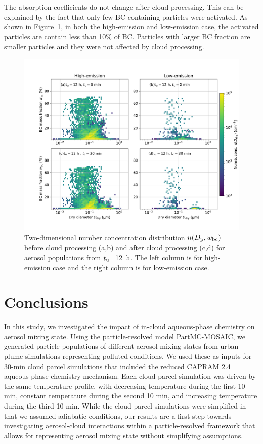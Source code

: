\documentclass[edeposit,fullpage]{uiucthesis2009}
\makeatletter
\DeclareRobustCommand*\unit[1]
 {\ensuremath{%
   {\thinmuskip3mu\relax
    \def\mu{\text{\textmu}}\def~{\,}%
    \ifx\f@series\testbx\mathbf{#1}\else\mathrm{#1}\fi}}}
\makeatother
\begin{document}
The absorption coefficients do not change after cloud processing.
This can be explained by the fact that only few BC-containing
particles were activated. As shown in Figure~\ref{fig:bc-2d}, in both
the high-emission and low-emission case, the activated particles are
contain less than 10\% of BC. Particles with larger BC fraction are
smaller particles and they were not affected by cloud processing.
 
 \begin{figure}[H]
    \centering
    \includegraphics[scale=0.5]{chap3_figs/fig15.pdf}
    \caption{Two-dimensional number concentration distribution
      $n(D_{\rm p}, w_{\rm bc})$ before cloud processing (a,b) and
      after cloud processing (c,d) for aerosol populations from
      $t_{\rm u}$=12~\unit{h}.  The left column is for high-emission
      case and the right column is for low-emission case.}
    \label{fig:bc-2d}
\end{figure}

%
\section{Conclusions}
\label{sec:conclusions}
In this study, we investigated the impact of in-cloud aqueous-phase
chemistry on aerosol mixing state. Using the particle-resolved model
PartMC-MOSAIC, we generated particle populations of different aerosol
mixing states from urban plume simulations representing
polluted conditions. We used these as inputs for 30-min cloud parcel
simulations that included the reduced CAPRAM 2.4 aqueous-phase
chemistry mechanism. Each cloud parcel simulation was driven by the
same temperature profile, with decreasing temperature during the first
10 min, constant temperature during the second 10 min, and increasing
temperature during the third 10 min. While the cloud parcel
simulations were simplified in that we assumed adiabatic conditions,
our results are a first step towards investigating aerosol-cloud
interactions within a particle-resolved framework that allows for
representing aerosol mixing state without simplifying assumptions.
\end{document}

